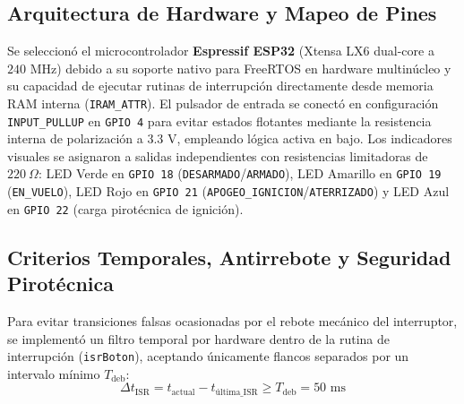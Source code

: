 \documentclass[10pt, letterpaper]{article}
\begin{document}
\subsection{Arquitectura de Hardware y Mapeo de Pines}
Se seleccionó el microcontrolador \textbf{Espressif ESP32} (Xtensa LX6 dual-core a $240\text{ MHz}$) debido a su soporte nativo para FreeRTOS en hardware multinúcleo y su capacidad de ejecutar rutinas de interrupción directamente desde memoria RAM interna (\texttt{IRAM\_ATTR}). El pulsador de entrada se conectó en configuración \texttt{INPUT\_PULLUP} en \texttt{GPIO 4} para evitar estados flotantes mediante la resistencia interna de polarización a $3.3\text{ V}$, empleando lógica activa en bajo. Los indicadores visuales se asignaron a salidas independientes con resistencias limitadoras de $220\ \Omega$: LED Verde en \texttt{GPIO 18} (\texttt{DESARMADO}/\texttt{ARMADO}), LED Amarillo en \texttt{GPIO 19} (\texttt{EN\_VUELO}), LED Rojo en \texttt{GPIO 21} (\texttt{APOGEO\_IGNICION}/\texttt{ATERRIZADO}) y LED Azul en \texttt{GPIO 22} (carga pirotécnica de ignición).

\subsection{Criterios Temporales, Antirrebote y Seguridad Pirotécnica}
Para evitar transiciones falsas ocasionadas por el rebote mecánico del interruptor, se implementó un filtro temporal por hardware dentro de la rutina de interrupción (\texttt{isrBoton}), aceptando únicamente flancos separados por un intervalo mínimo $T_{\text{deb}}$:
\begin{equation}
    \Delta t_{\text{ISR}} = t_{\text{actual}} - t_{\text{última\_ISR}} \ge T_{\text{deb}} = 50\text{ ms}
    \label{eq:debounce}
\end{equation}
\end{document}

